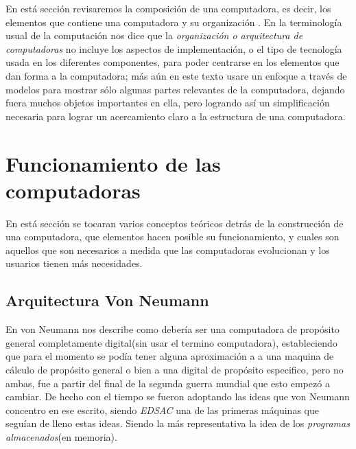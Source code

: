\documentclass[letterpaper,12pt,oneside]{book}
\begin{document}
	En está sección revisaremos la composición de una computadora, es decir, los elementos que contiene una computadora y su organización
	. En la terminología usual de la computación \cite{tanenbaum_structured_2013} nos dice que la  \textit{organización o arquitectura de computadoras}
	no incluye los aspectos de implementación, o el tipo de tecnología usada en los diferentes componentes, para poder centrarse en los
	elementos que dan forma a la computadora; más aún en este texto usare un enfoque a través de modelos para mostrar sólo algunas partes relevantes
	de la computadora, dejando fuera muchos objetos importantes en ella, pero logrando así un simplificación necesaria para lograr un acercamiento
	claro a la estructura de una computadora.

	\section{Funcionamiento de las computadoras}   %
		
		En está sección se tocaran varios conceptos teóricos detrás de la construcción de una computadora, que elementos hacen posible su funcionamiento,
		y cuales son aquellos que son necesarios a medida que las computadoras evolucionan y los usuarios tienen más necesidades.
		
		\subsection{Arquitectura Von Neumann}
		
		En \cite{von_neumann_papers_1987} von Neumann nos describe como debería ser una computadora de propósito general completamente digital(sin usar el 
		termino computadora), estableciendo que para el momento se podía tener alguna aproximación a a una maquina de cálculo de propósito general o
		bien a una digital de propósito especifico, pero no ambas, fue a partir del final de la segunda guerra mundial que esto empezó a cambiar. De hecho
		con el tiempo se fueron adoptando las ideas que von Neumann concentro en ese escrito, siendo \textit{EDSAC} una de las primeras máquinas
		que seguían de lleno estas ideas. Siendo la más representativa la idea de los \textit{programas almacenados}(en memoria).
		
\end{document}

